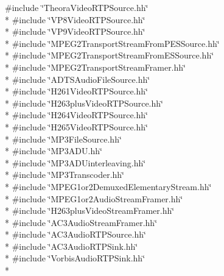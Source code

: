 {\ttfamily \#include \char`\"{}Theora\+Video\+R\+T\+P\+Source.\+hh\char`\"{}}\\*
{\ttfamily \#include \char`\"{}V\+P8\+Video\+R\+T\+P\+Source.\+hh\char`\"{}}\\*
{\ttfamily \#include \char`\"{}V\+P9\+Video\+R\+T\+P\+Source.\+hh\char`\"{}}\\*
{\ttfamily \#include \char`\"{}M\+P\+E\+G2\+Transport\+Stream\+From\+P\+E\+S\+Source.\+hh\char`\"{}}\\*
{\ttfamily \#include \char`\"{}M\+P\+E\+G2\+Transport\+Stream\+From\+E\+S\+Source.\+hh\char`\"{}}\\*
{\ttfamily \#include \char`\"{}M\+P\+E\+G2\+Transport\+Stream\+Framer.\+hh\char`\"{}}\\*
{\ttfamily \#include \char`\"{}A\+D\+T\+S\+Audio\+File\+Source.\+hh\char`\"{}}\\*
{\ttfamily \#include \char`\"{}H261\+Video\+R\+T\+P\+Source.\+hh\char`\"{}}\\*
{\ttfamily \#include \char`\"{}H263plus\+Video\+R\+T\+P\+Source.\+hh\char`\"{}}\\*
{\ttfamily \#include \char`\"{}H264\+Video\+R\+T\+P\+Source.\+hh\char`\"{}}\\*
{\ttfamily \#include \char`\"{}H265\+Video\+R\+T\+P\+Source.\+hh\char`\"{}}\\*
{\ttfamily \#include \char`\"{}M\+P3\+File\+Source.\+hh\char`\"{}}\\*
{\ttfamily \#include \char`\"{}M\+P3\+A\+D\+U.\+hh\char`\"{}}\\*
{\ttfamily \#include \char`\"{}M\+P3\+A\+D\+Uinterleaving.\+hh\char`\"{}}\\*
{\ttfamily \#include \char`\"{}M\+P3\+Transcoder.\+hh\char`\"{}}\\*
{\ttfamily \#include \char`\"{}M\+P\+E\+G1or2\+Demuxed\+Elementary\+Stream.\+hh\char`\"{}}\\*
{\ttfamily \#include \char`\"{}M\+P\+E\+G1or2\+Audio\+Stream\+Framer.\+hh\char`\"{}}\\*
{\ttfamily \#include \char`\"{}H263plus\+Video\+Stream\+Framer.\+hh\char`\"{}}\\*
{\ttfamily \#include \char`\"{}A\+C3\+Audio\+Stream\+Framer.\+hh\char`\"{}}\\*
{\ttfamily \#include \char`\"{}A\+C3\+Audio\+R\+T\+P\+Source.\+hh\char`\"{}}\\*
{\ttfamily \#include \char`\"{}A\+C3\+Audio\+R\+T\+P\+Sink.\+hh\char`\"{}}\\*
{\ttfamily \#include \char`\"{}Vorbis\+Audio\+R\+T\+P\+Sink.\+hh\char`\"{}}\\*
